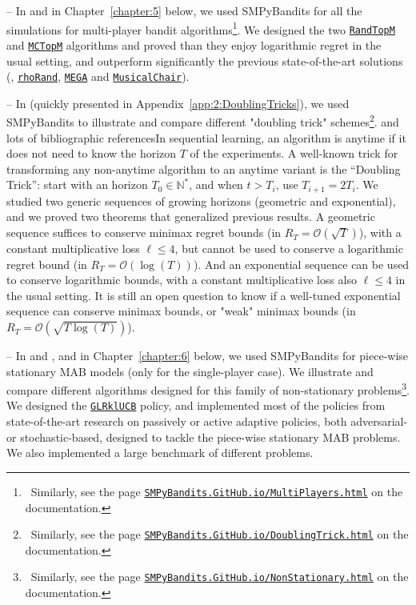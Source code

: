 -- In \cite{Besson2018ALT} and in Chapter~\ref{chapter:5} below, we used SMPyBandits for all the simulations for multi-player bandit algorithms\footnote{~Similarly, see the page \texttt{\href{https://SMPyBandits.GitHub.io/MultiPlayers.html}{SMPyBandits.GitHub.io/MultiPlayers.html}} on the documentation.}. We designed the two \texttt{\href{https://SMPyBandits.GitHub.io/docs/PoliciesMultiPlayers.RandTopM.html}{RandTopM}} and \texttt{\href{https://SMPyBandits.GitHub.io/docs/PoliciesMultiPlayers.MCTopM.html}{MCTopM}} algorithms and proved than they enjoy logarithmic regret in the usual setting, and outperform significantly the previous state-of-the-art solutions (\ie, \texttt{\href{https://SMPyBandits.GitHub.io/docs/PoliciesMultiPlayers.rhoRand.html}{rhoRand}}, \texttt{\href{https://SMPyBandits.GitHub.io/docs/Policies.MEGA.html}{MEGA}} and \texttt{\href{https://SMPyBandits.GitHub.io/docs/Policies.MusicalChair.html}{MusicalChair}}).

-- In \cite{Besson2018DoublingTricks} (quickly presented in Appendix~\ref{app:2:DoublingTricks}), we used SMPyBandits to illustrate and compare different "doubling trick" schemes\footnote{~Similarly, see the page \texttt{\href{https://SMPyBandits.GitHub.io/DoublingTrick.html}{SMPyBandits.GitHub.io/DoublingTrick.html}} on the documentation.}. and lots of bibliographic referencesIn sequential learning, an algorithm is anytime if it does not need to know the horizon $T$ of the experiments. A well-known trick for transforming any non-anytime algorithm to an anytime variant is the ``Doubling Trick'': start with an horizon $T_0\in\mathbb{N}^*$, and when $t > T_i$, use $T_{i+1} = 2 T_i$. We studied two generic sequences of growing horizons (geometric and exponential), and we proved two theorems that generalized previous results. A geometric sequence suffices to conserve minimax regret bounds (in $R_T = \mathcal{O}(\sqrt{T})$), with a constant multiplicative loss $\ell \leq 4$, but cannot be used to conserve a logarithmic regret bound (in $R_T = \mathcal{O}(\log(T))$). And an exponential sequence can be used to conserve logarithmic bounds, with a constant multiplicative loss also $\ell \leq 4$ in the usual setting. It is still an open question to know if a well-tuned exponential sequence can conserve minimax bounds, or "weak" minimax bounds (in $R_T = \mathcal{O}(\sqrt{T \log(T)})$).

-- In \cite{Besson2019GLRT} and \cite{Besson2019Gretsi}, and in Chapter~\ref{chapter:6} below, we used SMPyBandits for piece-wise stationary MAB models (only for the single-player case). We illustrate and compare different algorithms designed for this family of non-stationary problems\footnote{~Similarly, see the page \texttt{\href{https://SMPyBandits.GitHub.io/NonStationary.html}{SMPyBandits.GitHub.io/NonStationary.html}} on the documentation.}.
We designed the \texttt{\href{https://SMPyBandits.GitHub.io/docs/Policies.GLR_UCB.html}{GLRklUCB}} policy, and implemented most of the policies from state-of-the-art research on passively or active adaptive policies, both adversarial- or stochastic-based, designed to tackle the piece-wise stationary MAB problems.
We also implemented a large benchmark of different problems.


